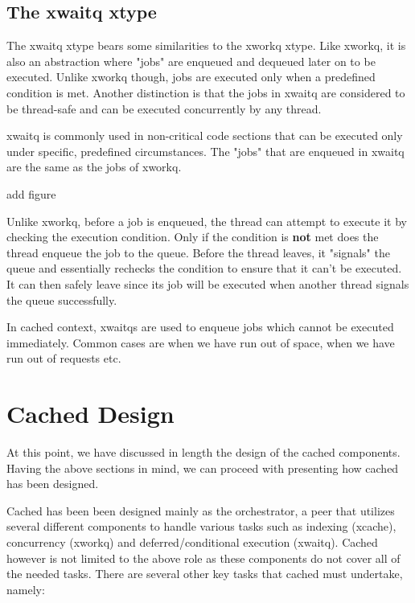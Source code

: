 \subsection{The xwaitq xtype}\label{sec:xwaitq-design}

The xwaitq xtype bears some similarities to the xworkq xtype. Like xworkq, it 
is also an abstraction where "jobs" are enqueued and dequeued later on to be 
executed. Unlike xworkq though, jobs are executed only when a predefined 
condition is met. Another distinction is that the jobs in xwaitq are considered 
to be thread-safe and can be executed concurrently by any thread.  

xwaitq is commonly used in non-critical code sections that can be executed only 
under specific, predefined circumstances. The "jobs" that are enqueued in 
xwaitq are the same as the jobs of xworkq.

\fixme add figure

Unlike xworkq, before a job is enqueued, the thread can attempt to execute it 
by checking the execution condition. Only if the condition is \textbf{not} met 
does the thread enqueue the job to the queue. Before the thread leaves, it 
"signals" the queue and essentially rechecks the condition to ensure that it 
can't be executed. It can then safely leave since its job will be executed when 
another thread signals the queue successfully.

In cached context, xwaitqs are used to enqueue jobs which cannot be executed 
immediately. Common cases are when we have run out of space, when we have run 
out of requests etc.

\section{Cached Design}\label{sec:cached-design}

At this point, we have discussed in length the design of the cached components.  
Having the above sections in mind, we can proceed with presenting how cached 
has been designed.

Cached has been been designed mainly as the orchestrator, a peer that utilizes 
several different components to handle various tasks such as indexing (xcache), 
concurrency (xworkq) and deferred/conditional execution (xwaitq). Cached 
however is not limited to the above role as these components do not cover all 
of the needed tasks. There are several other key tasks that cached must 
undertake, namely:

